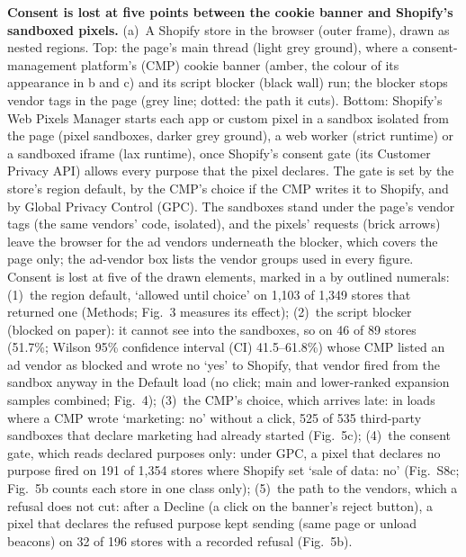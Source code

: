 \caption{\textbf{Consent is lost at five points between the cookie banner and Shopify's sandboxed pixels.}
(a)~A Shopify store in the browser (outer frame), drawn as nested regions. Top: the page's main thread (light grey ground), where a consent-management platform's (CMP) cookie banner (amber, the colour of its appearance in b and c) and its script blocker (black wall) run; the blocker stops vendor tags in the page (grey line; dotted: the path it cuts). Bottom: Shopify's Web Pixels Manager starts each app or custom pixel in a sandbox isolated from the page (pixel sandboxes, darker grey ground), a web worker (strict runtime) or a sandboxed iframe (lax runtime), once Shopify's consent gate (its Customer Privacy API) allows every purpose that the pixel declares. The gate is set by the store's region default, by the CMP's choice if the CMP writes it to Shopify, and by Global Privacy Control (GPC). The sandboxes stand under the page's vendor tags (the same vendors' code, isolated), and the pixels' requests (brick arrows) leave the browser for the ad vendors underneath the blocker, which covers the page only; the ad-vendor box lists the vendor groups used in every figure. Consent is lost at five of the drawn elements, marked in a by outlined numerals: (1)~the region default, `allowed until choice' on 1,103 of 1,349 stores that returned one (Methods; Fig.~3 measures its effect); (2)~the script blocker (blocked on paper): it cannot see into the sandboxes, so on 46 of 89 stores (51.7\%; Wilson 95\% confidence interval (CI) 41.5--61.8\%) whose CMP listed an ad vendor as blocked and wrote no `yes' to Shopify, that vendor fired from the sandbox anyway in the Default load (no click; main and lower-ranked expansion samples combined; Fig.~4); (3)~the CMP's choice, which arrives late: in loads where a CMP wrote `marketing: no' without a click, 525 of 535 third-party sandboxes that declare marketing had already started (Fig.~5c); (4)~the consent gate, which reads declared purposes only: under GPC, a pixel that declares no purpose fired on 191 of 1,354 stores where Shopify set `sale of data: no' (Fig.~S8c; Fig.~5b counts each store in one class only); (5)~the path to the vendors, which a refusal does not cut: after a Decline (a click on the banner's reject button), a pixel that declares the refused purpose kept sending (same page or unload beacons) on 32 of 196 stores with a recorded refusal (Fig.~5b).
}
